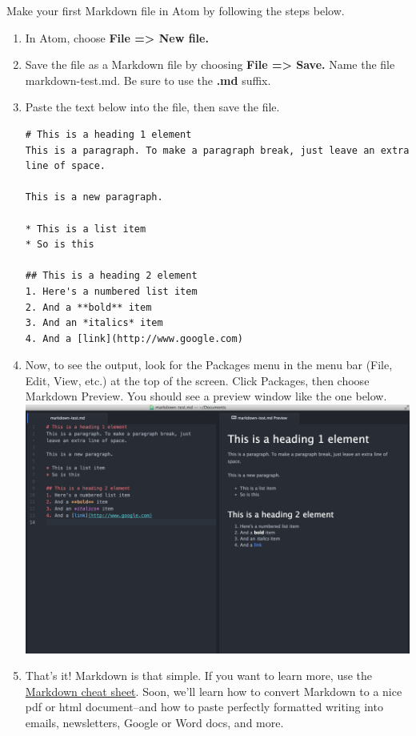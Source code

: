 \documentclass[]{book}
\theoremstyle{definition}
\theoremstyle{definition}
\theoremstyle{definition}
\theoremstyle{remark}
\begin{document}
Make your first Markdown file in Atom by following the steps below.

\begin{enumerate}
\def\labelenumi{\arabic{enumi}.}
\item
  In Atom, choose \textbf{File =\textgreater{} New file.}
\item
  Save the file as a Markdown file by choosing \textbf{File
  =\textgreater{} Save.} Name the file markdown-test.md. Be sure to use
  the \textbf{.md} suffix.
\item
  Paste the text below into the file, then save the file.

\begin{verbatim}
# This is a heading 1 element  
This is a paragraph. To make a paragraph break, just leave an extra line of space.  

This is a new paragraph.  

* This is a list item  
* So is this  

## This is a heading 2 element  
1. Here's a numbered list item  
2. And a **bold** item  
3. And an *italics* item  
4. And a [link](http://www.google.com)
\end{verbatim}
\item
  Now, to see the output, look for the Packages menu in the menu bar
  (File, Edit, View, etc.) at the top of the screen. Click Packages,
  then choose Markdown Preview. You should see a preview window like the
  one below.\\
  \includegraphics{markdown.png}
\item
  That's it! Markdown is that simple. If you want to learn more, use the
  \href{https://guides.github.com/pdfs/markdown-cheatsheet-online.pdf}{Markdown
  cheat sheet}. Soon, we'll learn how to convert Markdown to a nice pdf
  or html document--and how to paste perfectly formatted writing into
  emails, newsletters, Google or Word docs, and more.
\end{enumerate}
\end{document}
